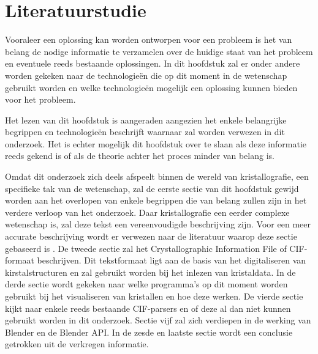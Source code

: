 
\chapter{Literatuurstudie}

Vooraleer een oplossing  kan worden ontworpen voor een probleem is het van belang de nodige informatie te verzamelen over de huidige staat van het probleem en eventuele reeds bestaande oplossingen. In dit hoofdstuk zal er onder andere worden gekeken naar de technologieën die op dit moment in de wetenschap gebruikt worden en welke technologieën mogelijk een oplossing kunnen bieden voor het probleem. 
\par
Het lezen van dit hoofdstuk is aangeraden aangezien het enkele belangrijke begrippen en technologieën beschrijft waarnaar zal worden verwezen in dit onderzoek. Het is echter mogelijk dit hoofdstuk over te slaan als deze informatie reeds gekend is of als de theorie achter het proces minder van belang is.
\par
Omdat dit onderzoek zich deels afspeelt binnen de wereld van kristallografie, een specifieke tak van de wetenschap, zal de eerste sectie van dit hoofdstuk gewijd worden aan het overlopen van enkele begrippen die van belang zullen zijn in het verdere verloop van het onderzoek. Daar kristallografie een eerder complexe wetenschap is, zal deze tekst een vereenvoudigde beschrijving zijn. Voor een meer accurate beschrijving wordt er verwezen naar de literatuur waarop deze sectie gebaseerd is \citep*{CRYS1}. De tweede sectie zal het Crystallographic Information File of CIF-formaat beschrijven. Dit tekstformaat ligt aan de basis van het digitaliseren van kirstalstructuren en zal gebruikt worden bij het inlezen van kristaldata. In de derde sectie wordt gekeken naar welke programma’s op dit moment worden gebruikt bij het visualiseren van kristallen en hoe deze werken. De vierde sectie kijkt naar enkele reeds bestaande CIF-parsers en of deze al dan niet kunnen gebruikt worden in dit onderzoek. Sectie vijf zal zich verdiepen in de werking van Blender en de Blender API. In de zesde en laatste sectie wordt een conclusie getrokken uit de verkregen informatie.


